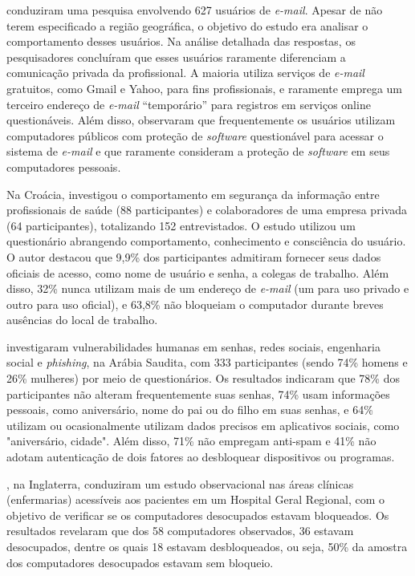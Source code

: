 \documentclass[portuguese]{textolivre}
\begin{document}
\textcite{galba_evidential_2018} conduziram uma pesquisa envolvendo 627 usuários de \textit{e-mail}. Apesar de não terem especificado a região geográfica, o objetivo do estudo era analisar o comportamento desses usuários. Na análise detalhada das respostas, os pesquisadores concluíram que esses usuários raramente diferenciam a comunicação privada da profissional. A maioria utiliza serviços de \textit{e-mail} gratuitos, como Gmail e Yahoo, para fins profissionais, e raramente emprega um terceiro endereço de \textit{e-mail} “temporário” para registros em serviços online questionáveis. Além disso, observaram que frequentemente os usuários utilizam computadores públicos com proteção de \textit{software} questionável para acessar o sistema de \textit{e-mail} e que raramente consideram a proteção de \textit{software} em seus computadores pessoais.

Na Croácia, \textcite{erceg_information_2019} investigou o comportamento em segurança da informação entre profissionais de saúde (88 participantes) e colaboradores de uma empresa privada (64 participantes), totalizando 152 entrevistados. O estudo utilizou um questionário abrangendo comportamento, conhecimento e consciência do usuário. O autor destacou que 9,9\% dos participantes admitiram fornecer seus dados oficiais de acesso, como nome de usuário e senha, a colegas de trabalho. Além disso, 32\% nunca utilizam mais de um endereço de \textit{e-mail} (um para uso privado e outro para uso oficial), e 63,8\% não bloqueiam o computador durante breves ausências do local de trabalho.

\textcite{alsharif_impact_2022} investigaram vulnerabilidades humanas em senhas, redes sociais, engenharia social e \textit{phishing}, na Arábia Saudita, com 333 participantes (sendo 74\% homens e 26\% mulheres) por meio de questionários. Os resultados indicaram que 78\% dos participantes não alteram frequentemente suas senhas, 74\% usam informações pessoais, como aniversário, nome do pai ou do filho em suas senhas, e 64\% utilizam ou ocasionalmente utilizam dados precisos em aplicativos sociais, como "aniversário, cidade". Além disso, 71\% não empregam anti-spam e 41\% não adotam autenticação de dois fatores ao desbloquear dispositivos ou programas.

\textcite{mohammed_locked_2021}, na Inglaterra, conduziram um estudo observacional nas áreas clínicas (enfermarias) acessíveis aos pacientes em um Hospital Geral Regional, com o objetivo de verificar se os computadores desocupados estavam bloqueados. Os resultados revelaram que dos 58 computadores observados, 36 estavam desocupados, dentre os quais 18 estavam desbloqueados, ou seja, 50\% da amostra dos computadores desocupados estavam sem bloqueio.
\end{document}
